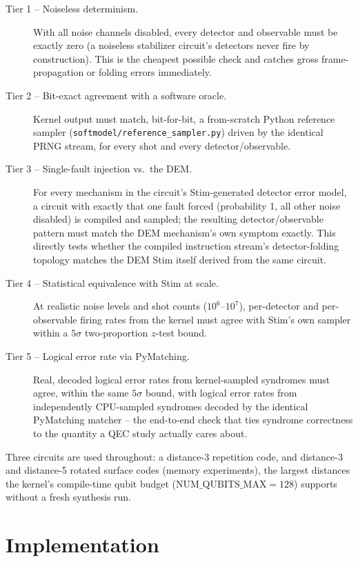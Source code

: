 \documentclass[pdflatex,sn-basic]{sn-jnl}
\begin{document}
\begin{description}
\item[Tier 1 -- Noiseless determinism.] With all noise channels disabled, every detector and observable must be exactly zero (a noiseless stabilizer circuit's detectors never fire by construction). This is the cheapest possible check and catches gross frame-propagation or folding errors immediately.
\item[Tier 2 -- Bit-exact agreement with a software oracle.] Kernel output must match, bit-for-bit, a from-scratch Python reference sampler (\texttt{softmodel/reference\_sampler.py}) driven by the identical PRNG stream, for every shot and every detector/observable.
\item[Tier 3 -- Single-fault injection vs.\ the DEM.] For every mechanism in the circuit's Stim-generated detector error model, a circuit with exactly that one fault forced (probability 1, all other noise disabled) is compiled and sampled; the resulting detector/observable pattern must match the DEM mechanism's own symptom exactly. This directly tests whether the compiled instruction stream's detector-folding topology matches the DEM Stim itself derived from the same circuit.
\item[Tier 4 -- Statistical equivalence with Stim at scale.] At realistic noise levels and shot counts ($10^6$--$10^7$), per-detector and per-observable firing rates from the kernel must agree with Stim's own sampler within a $5\sigma$ two-proportion $z$-test bound.
\item[Tier 5 -- Logical error rate via PyMatching.] Real, decoded logical error rates from kernel-sampled syndromes must agree, within the same $5\sigma$ bound, with logical error rates from independently CPU-sampled syndromes decoded by the identical PyMatching matcher -- the end-to-end check that ties syndrome correctness to the quantity a QEC study actually cares about.
\end{description}

Three circuits are used throughout: a distance-3 repetition code, and distance-3 and distance-5 rotated surface codes (memory experiments), the largest distances the kernel's compile-time qubit budget ($\mathrm{NUM\_QUBITS\_MAX}=128$) supports without a fresh synthesis run.

\section{Implementation}\label{sec:impl}
\end{document}
